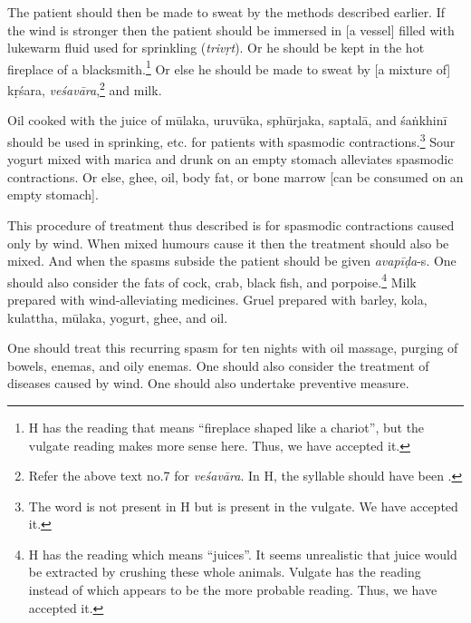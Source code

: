\begin{translation}
    The patient should then be made to sweat by the methods described earlier. If the wind is stronger then the patient should be immersed in [a vessel] filled with lukewarm fluid used for sprinkling (\textit{trivṛt}). Or he should be kept in the hot fireplace of a blacksmith.\footnote{H has the reading  that means \enquote{fireplace shaped like a chariot}, but the vulgate reading  makes more sense here. Thus, we have accepted it.} Or else he should be made to sweat by [a mixture of] \gls{kṛśara}, \textit{veśavāra},\footnote{Refer the above text no.7 for \textit{veśavāra}. In H, the syllable  should have been .} and milk.
 
    Oil cooked with the juice of \gls{mūlaka}, \gls{uruvūka}, \gls{sphūrjaka}, \gls{saptalā}, and \gls{śaṅkhinī} should be used in sprinking, etc. for patients with spasmodic contractions.\footnote{The word  is not present in H but is present in the vulgate. We have accepted it.} Sour yogurt mixed with \gls{marica} and drunk on an empty stomach alleviates spasmodic contractions. Or else, ghee, oil, body fat, or bone marrow [can be consumed on an empty stomach]. 
    
    This procedure of treatment thus described is for spasmodic contractions caused only by wind. When mixed humours cause it then the treatment should also be mixed. And when the spasms subside the patient should be given \textit{avapīḍa}-s. One should also consider the fats of cock, crab, black fish, and porpoise.\footnote{H has the reading  which means \enquote{juices}. It seems unrealistic that juice would be extracted by crushing these whole animals. Vulgate has the reading  instead of  which appears to be the more probable reading. Thus, we have accepted it.} Milk prepared with wind-alleviating medicines. Gruel prepared with barley, \gls{kola}, \gls{kulattha}, \gls{mūlaka}, yogurt, ghee, and oil. 

    One should treat this recurring spasm for ten nights with oil massage, purging of bowels, enemas, and oily enemas. One should also consider the treatment of diseases caused by wind. One should also undertake preventive measure.    
    
\end{translation}
